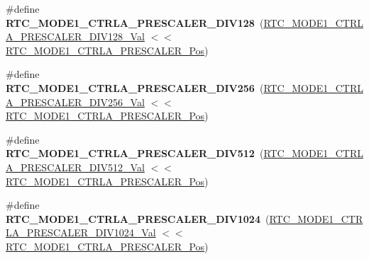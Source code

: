 \begin{DoxyCompactItemize}
\item 
\hypertarget{group___s_a_m_l21___r_t_c_gace6923f720be65db15759d6f459795e5}{}\#define {\bfseries R\+T\+C\+\_\+\+M\+O\+D\+E1\+\_\+\+C\+T\+R\+L\+A\+\_\+\+P\+R\+E\+S\+C\+A\+L\+E\+R\+\_\+\+D\+I\+V128}~(\hyperlink{group___s_a_m_l21___r_t_c_gaae159b33f80652ba06508134a380b9f4}{R\+T\+C\+\_\+\+M\+O\+D\+E1\+\_\+\+C\+T\+R\+L\+A\+\_\+\+P\+R\+E\+S\+C\+A\+L\+E\+R\+\_\+\+D\+I\+V128\+\_\+\+Val} $<$$<$ \hyperlink{group___s_a_m_l21___r_t_c_ga90e26e080dcf46aa7e9f09a8ed02ea7e}{R\+T\+C\+\_\+\+M\+O\+D\+E1\+\_\+\+C\+T\+R\+L\+A\+\_\+\+P\+R\+E\+S\+C\+A\+L\+E\+R\+\_\+\+Pos})\label{group___s_a_m_l21___r_t_c_gace6923f720be65db15759d6f459795e5}

\item 
\hypertarget{group___s_a_m_l21___r_t_c_ga4a24d6461f698a2bec62292f24f583db}{}\#define {\bfseries R\+T\+C\+\_\+\+M\+O\+D\+E1\+\_\+\+C\+T\+R\+L\+A\+\_\+\+P\+R\+E\+S\+C\+A\+L\+E\+R\+\_\+\+D\+I\+V256}~(\hyperlink{group___s_a_m_l21___r_t_c_ga389748b139b1e5f773c5eb0af1876c07}{R\+T\+C\+\_\+\+M\+O\+D\+E1\+\_\+\+C\+T\+R\+L\+A\+\_\+\+P\+R\+E\+S\+C\+A\+L\+E\+R\+\_\+\+D\+I\+V256\+\_\+\+Val} $<$$<$ \hyperlink{group___s_a_m_l21___r_t_c_ga90e26e080dcf46aa7e9f09a8ed02ea7e}{R\+T\+C\+\_\+\+M\+O\+D\+E1\+\_\+\+C\+T\+R\+L\+A\+\_\+\+P\+R\+E\+S\+C\+A\+L\+E\+R\+\_\+\+Pos})\label{group___s_a_m_l21___r_t_c_ga4a24d6461f698a2bec62292f24f583db}

\item 
\hypertarget{group___s_a_m_l21___r_t_c_ga9f2d7d26b38cff0732584ea2e72566c2}{}\#define {\bfseries R\+T\+C\+\_\+\+M\+O\+D\+E1\+\_\+\+C\+T\+R\+L\+A\+\_\+\+P\+R\+E\+S\+C\+A\+L\+E\+R\+\_\+\+D\+I\+V512}~(\hyperlink{group___s_a_m_l21___r_t_c_ga840b427da171cb0886fda3cca6b8013a}{R\+T\+C\+\_\+\+M\+O\+D\+E1\+\_\+\+C\+T\+R\+L\+A\+\_\+\+P\+R\+E\+S\+C\+A\+L\+E\+R\+\_\+\+D\+I\+V512\+\_\+\+Val} $<$$<$ \hyperlink{group___s_a_m_l21___r_t_c_ga90e26e080dcf46aa7e9f09a8ed02ea7e}{R\+T\+C\+\_\+\+M\+O\+D\+E1\+\_\+\+C\+T\+R\+L\+A\+\_\+\+P\+R\+E\+S\+C\+A\+L\+E\+R\+\_\+\+Pos})\label{group___s_a_m_l21___r_t_c_ga9f2d7d26b38cff0732584ea2e72566c2}

\item 
\hypertarget{group___s_a_m_l21___r_t_c_ga29d5b45f6a3fa1270612071d576172ab}{}\#define {\bfseries R\+T\+C\+\_\+\+M\+O\+D\+E1\+\_\+\+C\+T\+R\+L\+A\+\_\+\+P\+R\+E\+S\+C\+A\+L\+E\+R\+\_\+\+D\+I\+V1024}~(\hyperlink{group___s_a_m_l21___r_t_c_ga1daecc499796a06540183d7a920c29eb}{R\+T\+C\+\_\+\+M\+O\+D\+E1\+\_\+\+C\+T\+R\+L\+A\+\_\+\+P\+R\+E\+S\+C\+A\+L\+E\+R\+\_\+\+D\+I\+V1024\+\_\+\+Val} $<$$<$ \hyperlink{group___s_a_m_l21___r_t_c_ga90e26e080dcf46aa7e9f09a8ed02ea7e}{R\+T\+C\+\_\+\+M\+O\+D\+E1\+\_\+\+C\+T\+R\+L\+A\+\_\+\+P\+R\+E\+S\+C\+A\+L\+E\+R\+\_\+\+Pos})\label{group___s_a_m_l21___r_t_c_ga29d5b45f6a3fa1270612071d576172ab}


\end{DoxyCompactItemize}
